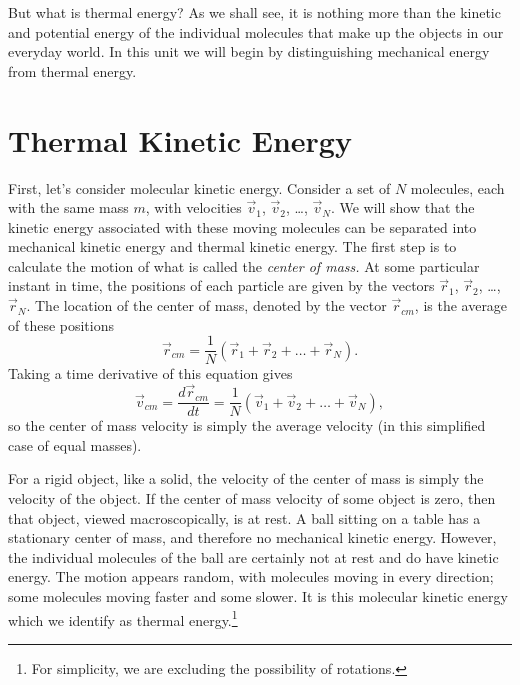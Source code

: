 But what is thermal energy?  As we shall see, it is nothing more than
the kinetic and potential energy of the individual molecules that make
up the objects in our everyday world.  In this unit we will begin by
distinguishing mechanical energy from thermal energy.

\section{Thermal Kinetic Energy}

\label{sec:thermal_kinetic_energy}

First, let's consider molecular kinetic energy.  Consider a set of $N$
molecules, each with the same mass $m$, with velocities $\vec v_1$,
$\vec v_2$, \dots, $\vec v_N$.  We will show that the kinetic energy
associated with these moving molecules can be separated into
mechanical kinetic energy and thermal kinetic energy.  The first step
is to calculate the motion of what is called the \textit{center of mass.}
At some particular instant in time, the positions of each particle are
given by the vectors $\vec r_1$, $\vec r_2$, \dots, $\vec r_N$.  The
location of the center of mass, denoted by the vector $\vec r_{cm}$,
is the average of these positions
\begin{equation}
\vec r_{cm} = \frac{1}{N}(\vec r_1 + \vec r_2 + \dots + \vec r_N).
\end{equation}
Taking a time derivative of this equation gives
\begin{equation}
\vec v_{cm} = \frac{d\vec r_{cm}}{dt} =
\frac{1}{N}(\vec v_1 + \vec v_2 + \dots + \vec v_N),
\end{equation}
so the center of mass velocity is simply the average velocity (in this
simplified case of equal masses).  

For a rigid object, like a solid, the velocity of the center of mass
is simply the velocity of the object.  If the center of mass velocity
of some object is zero, then that object, viewed macroscopically, is at
rest.  A ball sitting on a table has a stationary center of mass, and
therefore no mechanical kinetic energy.  However, the individual
molecules of the ball are certainly not at rest and do have kinetic
energy.  The motion appears random, with molecules moving in every
direction; some molecules moving faster and some slower.  It is this
molecular kinetic energy which we identify as thermal
energy.\footnote{For simplicity, we are excluding the possibility of
  rotations.}


